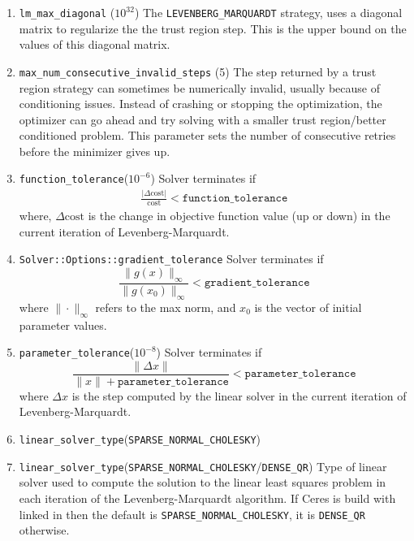 \begin{enumerate}
\item{\texttt{lm\_max\_diagonal} ($10^{32}$)}  The \texttt{LEVENBERG\_MARQUARDT} strategy, uses a diagonal matrix to regularize the the trust region step. This is the upper bound on the values of this diagonal matrix.

\item{\texttt{max\_num\_consecutive\_invalid\_steps} (5)} The step returned by a trust region strategy can sometimes be numerically invalid, usually because of conditioning issues. Instead of crashing or stopping the optimization, the optimizer can go ahead and try solving with a smaller trust region/better conditioned problem. This parameter sets the number of consecutive retries before the minimizer gives up.

\item{\texttt{function\_tolerance}}($10^{-6}$) Solver terminates if
\begin{align}
\frac{|\Delta \text{cost}|}{\text{cost}} < \texttt{function\_tolerance}
\end{align}
where, $\Delta \text{cost}$ is the change in objective function value (up or down) in the current iteration of Levenberg-Marquardt.

\item \texttt{Solver::Options::gradient\_tolerance} Solver terminates if 
\begin{equation}
    \frac{\|g(x)\|_\infty}{\|g(x_0)\|_\infty} < \texttt{gradient\_tolerance}
\end{equation}
where $\|\cdot\|_\infty$ refers to the max norm, and $x_0$ is the vector of initial parameter values.

\item{\texttt{parameter\_tolerance}}($10^{-8}$) Solver terminates if 
\begin{equation}
    \frac{\|\Delta x\|}{\|x\| + \texttt{parameter\_tolerance}} < \texttt{parameter\_tolerance}
\end{equation}
where $\Delta x$ is the step computed by the linear solver in the current iteration of Levenberg-Marquardt.

\item{\texttt{linear\_solver\_type}(\texttt{SPARSE\_NORMAL\_CHOLESKY})}

\item{\texttt{linear\_solver\_type}}(\texttt{SPARSE\_NORMAL\_CHOLESKY}/\texttt{DENSE\_QR}) Type of linear solver used to compute the solution to the linear least squares problem in each iteration of the Levenberg-Marquardt algorithm. If Ceres is build with \suitesparse linked in  then the default is \texttt{SPARSE\_NORMAL\_CHOLESKY}, it is \texttt{DENSE\_QR} otherwise.


\end{enumerate}
